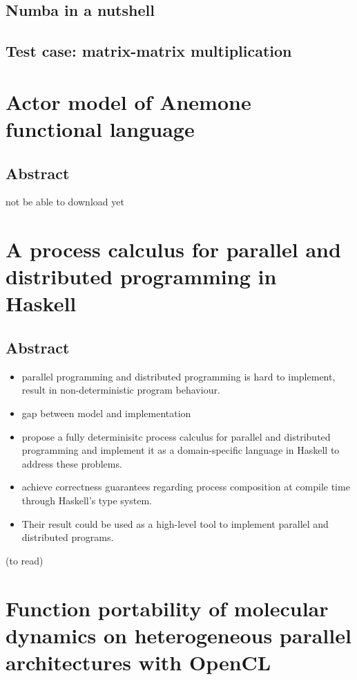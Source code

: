 \documentclass[11pt]{article}
\begin{document}
\subsection{Numba in a nutshell}
\label{sec-9-3}
\subsection{Test case: matrix-matrix multiplication}
\label{sec-9-4}

\section{Actor model of Anemone functional language \cite{batko18_actor_model_anemon_funct_languag}}
\label{sec-10}
\subsection{Abstract}
\label{sec-10-1}
not be able to download yet
\section{A process calculus for parallel and distributed programming in Haskell \cite{bloecker18_pardis}}
\label{sec-11}
\subsection{Abstract}
\label{sec-11-1}
\begin{itemize}
\item parallel programming and distributed programming is hard to implement, result in non-deterministic program behaviour.
\item gap between model and implementation
\item propose a fully determinisitc process calculus for parallel and distributed programming and implement it as a domain-specific language in Haskell to address these problems.
\item achieve correctness guarantees regarding process composition at compile time through Haskell's type system.
\item Their result could be used as a high-level tool to implement parallel and distributed programs.
\end{itemize}

(to read)
\section{Function portability of molecular dynamics on heterogeneous parallel architectures with OpenCL  \cite{halver18_funct_portab_molec_dynam_heter}}
\label{sec-12}
\end{document}
